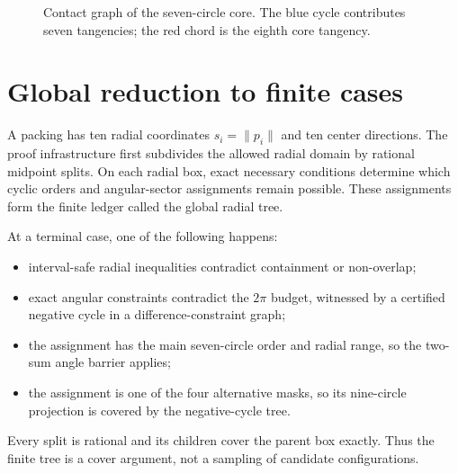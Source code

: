 \documentclass[11pt,a4paper]{article}
\theoremstyle{remark}
\newcommand{\norm}[1]{\lVert #1\rVert}
\begin{document}
\begin{figure}[ht]
\centering
{}
\caption{Contact graph of the seven-circle core. The blue cycle contributes
seven tangencies; the red chord is the eighth core tangency.}
\label{fig:core-contacts}
\end{figure}

\section{Global reduction to finite cases}
\label{sec:overview}

A packing has ten radial coordinates $s_i=\norm{p_i}$ and ten center
directions.  The proof infrastructure first subdivides the allowed radial
domain by rational midpoint splits.  On each radial box, exact necessary
conditions determine which cyclic orders and angular-sector assignments
remain possible.  These assignments form the finite ledger called the
global radial tree.

At a terminal case, one of the following happens:
\begin{itemize}
  \item interval-safe radial inequalities contradict containment or
        non-overlap;
  \item exact angular constraints contradict the $2\pi$ budget, witnessed
        by a certified negative cycle in a difference-constraint graph;
  \item the assignment has the main seven-circle order and radial range, so
        the two-sum angle barrier applies;
  \item the assignment is one of the four alternative masks, so its
        nine-circle projection is covered by the negative-cycle tree.
\end{itemize}
Every split is rational and its children cover the parent box exactly.  Thus
the finite tree is a cover argument, not a sampling of candidate
configurations.
\end{document}
